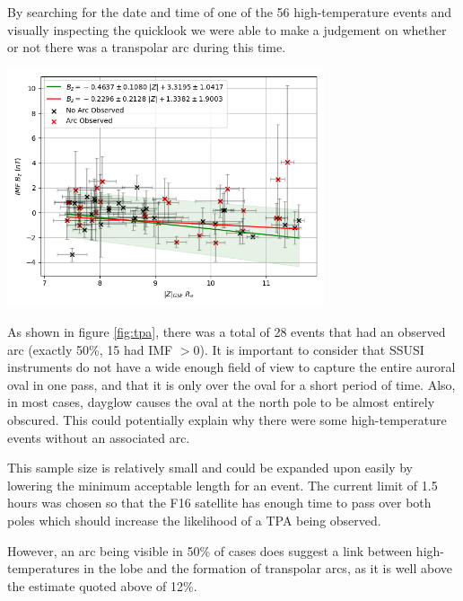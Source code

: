 \documentclass[12pt]{article}
\newenvironment{Figure}
  {\par\medskip\noindent\minipage{\linewidth}}
  {\endminipage\par\medskip}
\begin{document}
By searching for the date and time of one of the 56 high-temperature events and visually inspecting the quicklook we were able to make a judgement on whether or not there was a transpolar arc during this time.

\begin{Figure}
    \centering
    \includegraphics[width=0.7\textwidth]{tpa.png}
    \label{fig:tpa}
\end{Figure}

As shown in figure \ref{fig:tpa}, there was a total of 28 events that had an observed arc (exactly 50\%, 15 had IMF $> 0$). It is important to consider that SSUSI instruments do not have a wide enough field of view to capture the entire auroral oval in one pass, and that it is only over the oval for a short period of time. Also, in most cases, dayglow causes the oval at the north pole to be almost entirely obscured. This could potentially explain why there were some high-temperature events without an associated arc.

This sample size is relatively small and could be expanded upon easily by lowering the minimum acceptable length for an event. The current limit of 1.5 hours was chosen so that the F16 satellite has enough time to pass over both poles which should increase the likelihood of a TPA being observed.

However, an arc being visible in 50\% of cases does suggest a link between high-temperatures in the lobe and the formation of transpolar arcs, as it is well above the estimate quoted above of 12\%. 
\end{document}
